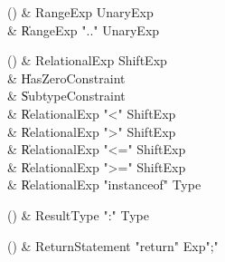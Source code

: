 \begin{bbgrammarappendix}

() & RangeExp \label{prod:RangeExp}  \: UnaryExp  \\

 &    \| RangeExp  \xcd".." UnaryExp  \\

\end{bbgrammarappendix}

\begin{bbgrammarappendix}

() & RelationalExp \label{prod:RelationalExp}  \: ShiftExp  \\

 &    \| HasZeroConstraint \\
 &    \| SubtypeConstraint \\
 &    \| RelationalExp \xcd"<" ShiftExp \\
 &    \| RelationalExp \xcd">" ShiftExp \\
 &    \| RelationalExp \xcd"<=" ShiftExp \\
 &    \| RelationalExp \xcd">=" ShiftExp \\
 &    \| RelationalExp \xcd"instanceof" Type \\

\end{bbgrammarappendix}

\begin{bbgrammarappendix}

() & ResultType \label{prod:ResultType}  \: \xcd":" Type  \\


\end{bbgrammarappendix}

\begin{bbgrammarappendix}

() & ReturnStatement \label{prod:ReturnStatement}  \: \xcd"return" Exp\opt \xcd";"  \\


\end{bbgrammarappendix}

